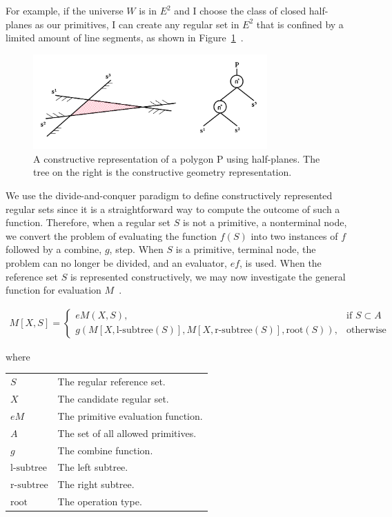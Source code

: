 \documentclass[a4paper,11pt,oneside]{article}
\makeatletter
\newenvironment{conditions}
  {\par\vspace{\abovedisplayskip}\noindent\begin{tabular}{>{$}l<{$} @{${}={}$} l}}
  {\end{tabular}\par\vspace{\belowdisplayskip}}
\makeatother
\begin{document}
For example, if the universe $W$ is in $E^2$ and I choose the class of closed half-planes as our primitives, I can create any regular set in $E^2$ that is confined by a limited amount of line segments, as shown in Figure~\ref{sect3:halfplane-csg}~\cite{tilove1977a}.

\begin{figure}[ht]
	\begin{center}
		\includegraphics[width=0.8\textwidth]{section3/3.2/halfplane-csg.png}
	\end{center}
	\caption{A constructive representation of a polygon P using half-planes. The tree on the right is the constructive geometry representation.}
	\label{sect3:halfplane-csg}
\end{figure}

We use the divide-and-conquer paradigm to define constructively represented regular sets since it is a straightforward way to compute the outcome of such a function. Therefore, when a regular set $S$ is not a primitive, a nonterminal node, we convert the problem of evaluating the function $f(S)$ into two instances of $f$ followed by a combine, $g$, step. When $S$ is a primitive, terminal node, the problem can no longer be divided, and an evaluator, $ef$, is used. When the reference set $S$ is represented constructively, we may now investigate the general function for evaluation $M$~\cite{tilove1977a}.

\begin{align}
	M[X,S]= 
	\begin{cases}
	eM(X, S),                                                                & \text{if } S \subset A \\
	g(M[X, \text{l-subtree}(S)], M[X, \text{r-subtree}(S)], \text{root}(S)), & \text{otherwise}       
	\end{cases}
\end{align}

where

\begin{conditions}
	S     				  &  The regular reference set. \\
	X     				  &  The candidate regular set. \\
	eM     	  &  The primitive evaluation function. \\
	A     			  	  &  The set of all allowed primitives. \\
	g     				  &  The combine function. \\
	\text{l-subtree}     &  The left subtree. \\
	\text{r-subtree}     &  The right subtree. \\
	\text{root}     	  &  The operation type. \\
\end{conditions}
\end{document}
